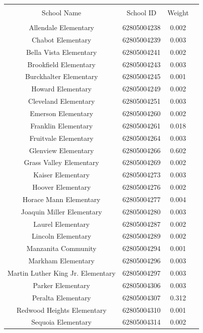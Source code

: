 \begin{table}[H] 
  \centering 
  \caption{} 
  \label{} 
\begin{longtable}{@{\extracolsep{5pt}} cccc}
\\[-1.8ex]\hline 
\hline \\[-1.8ex] 
School Name& School ID & Weight      \\ 
\hline \\[-1.8ex] 
Allendale Elementary & 62805004238 &  0.002 \\
Chabot Elementary & 62805004239 & 0.003  \\
Bella Vista Elementary & 62805004241 &    0.002\\
Brookfield Elementary & 62805004243 &  0.003  \\  
Burckhalter Elementary & 62805004245 &    0.001 \\
Howard Elementary & 62805004249 &    0.002  \\
Cleveland Elementary & 62805004251 &    0.003\\
Emerson Elementary & 62805004260 &   0.002  \\
Franklin Elementary & 62805004261 &    0.018   \\
Fruitvale Elementary & 62805004264 &    0.003 \\
Glenview Elementary & 62805004266 &    0.602 \\
Grass Valley Elementary & 62805004269 &   0.002\\
Kaiser Elementary & 62805004273 &    0.003  \\
Hoover Elementary & 62805004276 &    0.002 \\
Horace Mann Elementary & 62805004277 &    0.004  \\
Joaquin Miller Elementary & 62805004280&   0.003 \\
Laurel Elementary & 62805004287 &   0.002 \\
Lincoln Elementary & 62805004289 &    0.002 \\
Manzanita Community & 62805004294 &   0.001  \\
Markham Elementary & 62805004296 &   0.003\\
Martin Luther King Jr. Elementary & 62805004297 &   0.003\\
Parker Elementary & 62805004306 &   0.003 \\
Peralta Elementary & 62805004307 &  0.312\\
Redwood Heights Elementary & 62805004310 &   0.001 \\
Sequoia Elementary & 62805004314 &   0.002  \\

\end{longtable}
\end{table}
